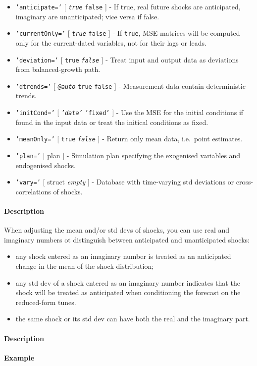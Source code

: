 \begin{itemize}
\item
  \texttt{'anticipate='} {[} \emph{\texttt{true}} \textbar{}
  \texttt{false} {]} - If true, real future shocks are anticipated,
  imaginary are unanticipated; vice versa if false.
\item
  \texttt{'currentOnly='} {[} \emph{\texttt{true}} \textbar{}
  \texttt{false} {]} - If \texttt{true}, MSE matrices will be computed
  only for the current-dated variables, not for their lags or leads.
\item
  \texttt{'deviation='} {[} \texttt{true} \textbar{}
  \emph{\texttt{false}} {]} - Treat input and output data as deviations
  from balanced-growth path.
\item
  \texttt{'dtrends='} {[} \emph{\texttt{@auto}} \textbar{} \texttt{true}
  \textbar{} \texttt{false} {]} - Measurement data contain deterministic
  trends.
\item
  \texttt{'initCond='} {[} \emph{\texttt{'data'}} \textbar{}
  \texttt{'fixed'} {]} - Use the MSE for the initial conditions if found
  in the input data or treat the initical conditions as fixed.
\item
  \texttt{'meanOnly='} {[} \texttt{true} \textbar{}
  \emph{\texttt{false}} {]} - Return only mean data, i.e.~point
  estimates.
\item
  \texttt{'plan='} {[} plan {]} - Simulation plan specifying the
  exogenised variables and endogenised shocks.
\item
  \texttt{'vary='} {[} struct \textbar{} \emph{empty} {]} - Database
  with time-varying std deviations or cross-correlations of shocks.
\end{itemize}

\paragraph{Description}\label{description}

When adjusting the mean and/or std devs of shocks, you can use real and
imaginary numbers ot distinguish between anticipated and unanticipated
shocks:

\begin{itemize}
\item
  any shock entered as an imaginary number is treated as an anticipated
  change in the mean of the shock distribution;
\item
  any std dev of a shock entered as an imaginary number indicates that
  the shock will be treated as anticipated when conditioning the
  forecast on the reduced-form tunes.
\item
  the same shock or its std dev can have both the real and the imaginary
  part.
\end{itemize}

\paragraph{Description}\label{description-1}

\paragraph{Example}\label{example}


